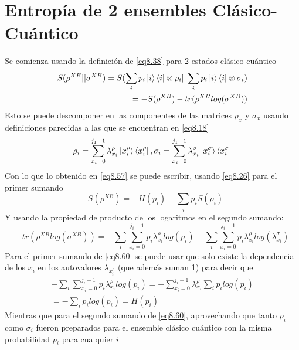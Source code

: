 \documentclass{book}
\begin{document}
    \section{{Entropía de 2 ensembles Clásico-Cuántico}} Se comienza usando la definición de \ref{eq8.38} para 2 estados clásico-cuántico
    \begin{equation}\label{eq8.57}\begin{aligned}{ S(\rho^{XB}||\sigma^{XB})=S(\sum_i p_i \ket{i}\bra{i}\otimes \rho_i || \sum_i p_i \ket{i}\bra{i}\otimes \sigma_i)} \\{ =-S(\rho^{XB})-tr(\rho^{XB}log(\sigma^{XB}))}\end{aligned} \end{equation}
    Esto se puede descomponer en las componentes de las matrices $\rho_x$ y $\sigma_x$ usando definiciones parecidas a las que se encuentran en \ref{eq8.18}
    \begin{equation}\label{eq8.58}{\rho_i=\sum_{x_i=0}^{j_1-1}\lambda_{x_i}^\rho \ket{x_i^\rho}\bra{x_i^\rho}, \sigma_i=\sum_{x_i=0}^{j_1-1}\lambda_{x_i}^\sigma \ket{x_i^\sigma}\bra{x_i^\sigma}}\end{equation}
    Con lo que lo obtenido en \ref{eq8.57} se puede escribir, usando \ref{eq8.26} para el primer sumando
    \begin{equation}\label{eq8.59}{-S(\rho^{XB})=-H(p_i)-\sum_i p_iS(\rho_i)}\end{equation}
    Y usando la propiedad de producto de los logaritmos en el segundo sumando:
    \begin{equation}\label{eq8.60}{-tr(\rho^{XB}log(\sigma^{XB}))=-\sum_i\sum_{x_i=0}^{j_i-1} p_i\lambda_{x_i}^\rho log (p_i)-\sum_i\sum_{x_i=0}^{j_i-1} p_i \lambda_{x_i}^\rho log(\lambda_{x_i}^\sigma)}\end{equation}
    Para el primer sumando de \ref{eq8.60} se puede usar que solo existe la dependencia de los $x_i$ en los autovalores $\lambda_{x_i^\rho}$ (que además suman 1) para decir que 
    \begin{equation}\label{eq8.61}\begin{aligned}{-\sum_i\sum_{x_i=0}^{j_i-1} p_i\lambda_{x_i}^\rho log (p_i)=-\sum_{x_i=0}^{j_i-1} \lambda_{x_i}^\rho \sum_ip_i log (p_i)}\\{ =- \sum_i p_i log(p_i)=H(p_i)}\end{aligned}\end{equation}
    Mientras que para el segundo sumando de \ref{eq8.60}, aprovechando que tanto $\rho_i$ como $\sigma_i$ fueron preparados para el ensemble clásico cuántico con la misma probabilidad $p_i$ para cualquier $i$
\end{document}

